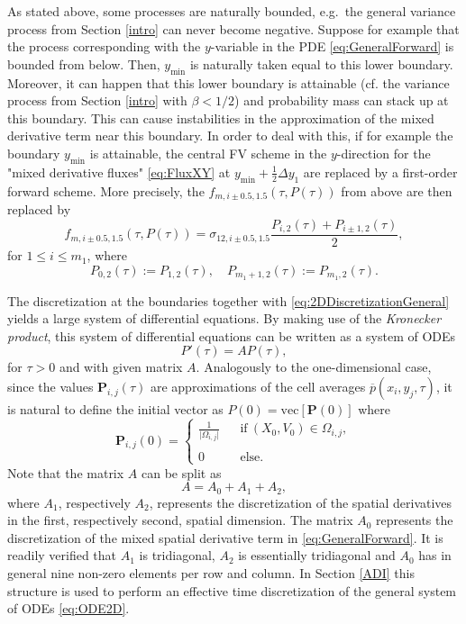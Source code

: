 \documentclass[10pt]{article}
\begin{document}
As stated above, some processes are naturally bounded, e.g.\ the general variance process from Section \ref{intro} can never become negative. 
Suppose for example that the process corresponding with the $y$-variable in the PDE \eqref{eq:GeneralForward} is bounded from below. Then, $y_{\min}$ is naturally taken equal to this lower boundary. Moreover, it can happen that this lower boundary is attainable (cf. the variance process from Section \ref{intro} with $\beta < 1/2$) and probability mass can stack up at this boundary. This can cause instabilities in the approximation of the mixed derivative term near this boundary. In order to deal with this, if for example the boundary $y_{\min}$ is attainable, the central FV scheme in the $y$-direction for the "mixed derivative fluxes" \eqref{eq:FluxXY} at $y_{\min}+\tfrac{1}{2}\Delta y_{1}$ are replaced by a first-order forward scheme. More precisely, the $f_{m,i \pm 0.5, 1.5}(\tau,P(\tau))$ from above are then replaced by
$$ f_{m,i \pm 0.5, 1.5}(\tau,P(\tau)) =  \sigma_{12,i\pm0.5,1.5} \frac{P_{i,2}(\tau)+P_{i \pm 1,2}(\tau)}{2}, $$
for $1 \leq i \leq m_{1}$, where
$$ P_{0,2}(\tau) := P_{1,2}(\tau), \quad P_{m_{1}+1,2}(\tau) := P_{m_{1},2}(\tau). $$  

The discretization at the boundaries together with \eqref{eq:2DDiscretizationGeneral} yields a large system of differential equations. By making use of the \textit{Kronecker product}, this system of differential equations can be written as a system of ODEs
\begin{equation}
P'(\tau) = A P(\tau),
\label{eq:ODE2D}
\end{equation} 
for $\tau > 0$ and with given matrix $A$. 
Analogously to the one-dimensional case, since the values $\boldsymbol{P}_{i,j}(\tau)$ are approximations of the cell averages $\overline{p}(x_{i},y_{j},\tau)$, it is natural to define the initial vector as $P(0) = \mathrm{vec}[\boldsymbol{P}(0)]$ where
$$ \boldsymbol{P}_{i,j}(0) = \left\{ \begin{array}{lll}
\tfrac{1}{\vert \Omega_{i,j} \vert} & & \mathrm{if} \ (X_{0},V_{0}) \in \Omega_{i,j}, \\ \\
0 & & \mathrm{else.}
\end{array} \right. $$
Note that the matrix $A$ can be split as
$$ A = A_{0} + A_{1} + A_{2},$$
where $A_{1}$, respectively $A_{2}$, represents the discretization of the spatial derivatives in the first, respectively second, spatial dimension. The matrix $A_{0}$ represents the discretization of the mixed spatial derivative term in \eqref{eq:GeneralForward}. It is readily verified that $A_{1}$ is tridiagonal, $A_{2}$ is essentially tridiagonal and $A_{0}$ has in general nine non-zero elements per row and column. 
In Section \ref{ADI} this structure is used to perform an effective time discretization of the general system of ODEs \eqref{eq:ODE2D}.
\end{document}
